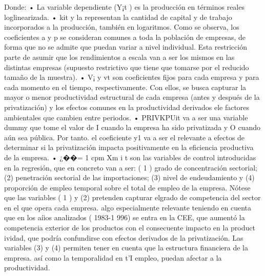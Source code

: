 \documentclass[10pt,a4paper]{article}
\begin{document}
Donde:
• La variable dependiente (Y¡t ) es la producción en términos reales loglinearizada.
• kit y la representan la cantidad de capital y de trabajo incorporados a la producción, también en logaritmos. Como se observa, los coeficientes a y p se consideran comunes a toda la población de empresas, de forma que no se admite que puedan variar a nivel individual. Esta restricción parte de asumir que los rendimientos a escala van a ser los mismos en las distintas empresas (supuesto restrictivo que tiene que tomarse por el reducido tamaño de la muestra).
• V¡ y vt son coeficientes fijos para cada empresa y para cada momento en el tiempo, respectivamente. Con ellos, se busca capturar la mayor o menor productividad estructural de cada empresa (antes y después de la privatización) y los efectos comunes en la productividad derivados ele factores ambientales que cambien entre periodos.
• PRIVKPUit va a ser una variable dummy que tome el valor de I cuando la empresa ha sido privatizada y O cuando aún sea pública. Por tanto. el coeficiente y1 va a ser el relevante a efectos de determinar si la privatización impacta positivamente en la eficiencia productiva de la empresa. 
• ¿��= 1 cpm Xm i t son las variables de control introducidas en la regresión, que en concreto van a ser: ( 1 ) grado de concentración sectorial; (2) penetración sectorial de las importaciones; (3) nivel de endeudamiento y (4) proporción de empleo temporal sobre el total de empleo de la empresa. Nótese que las variables ( 1 ) y (2) pretenden capturar elgrado de competencia del sector en el que opera cada empresa. algo especialmente relevante teniendo en cuenta que en los aíios analizados ( 1983-1 996) se entra en la CEE, que aumentó la competencia exterior de los productos con el consecuente impacto en la product ividad, que podría confundirse con efectos derivados de la privatización. Las variables (3) y (4) permiten tener en cuenta que la estructura financiera de la empresa. así como la temporalidad en t'I empleo, puedan afectar a la productividad.
\end{document}

